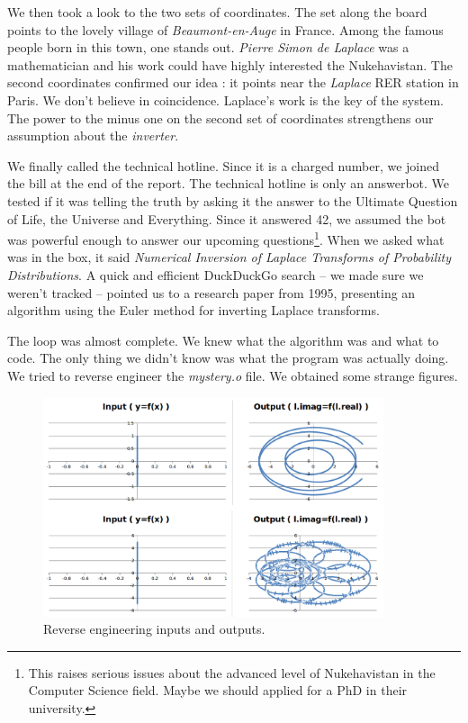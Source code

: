 \documentclass[11pt,a4paper]{article}
\begin{document}
We then took a look to the two sets of coordinates. The set along the board points to the lovely village of \textit{Beaumont-en-Auge} in France. Among the famous people born in this town, one stands out. \textit{Pierre Simon de Laplace} was a mathematician and his work could have highly interested the Nukehavistan. The second coordinates confirmed our idea : it points near the \textit{Laplace} RER station in Paris. We don't believe in coincidence. Laplace's work is the key of the system. The power to the minus one on the second set of coordinates strengthens our assumption about the \textit{inverter}.

We finally called the technical hotline. Since it is a charged number, we joined the bill at the end of the report. The technical hotline is only an answerbot. We tested if it was telling the truth by asking it the answer to the Ultimate Question of Life, the Universe and Everything. Since it answered 42, we assumed the bot was powerful enough to answer our upcoming questions\footnote{This raises serious issues about the advanced level of Nukehavistan in the Computer Science field. Maybe we should applied for a PhD in their university.}. When we asked what was in the box, it said \textit{Numerical Inversion of Laplace Transforms of Probability Distributions}. A quick and efficient DuckDuckGo search -- we made sure we weren't tracked -- pointed us to a research paper from 1995, presenting an algorithm using the Euler method for inverting Laplace transforms.

The loop was almost complete. We knew what the algorithm was and what to code. The only thing we didn't know was what the program was actually doing. We tried to reverse engineer the \textit{mystery.o} file. We obtained some strange figures.

\begin{figure}[!h]
\centering
\includegraphics[width=10cm]{outputs.png}
\caption{Reverse engineering inputs and outputs.}
\label{reverse}
\end{figure}
\end{document}
